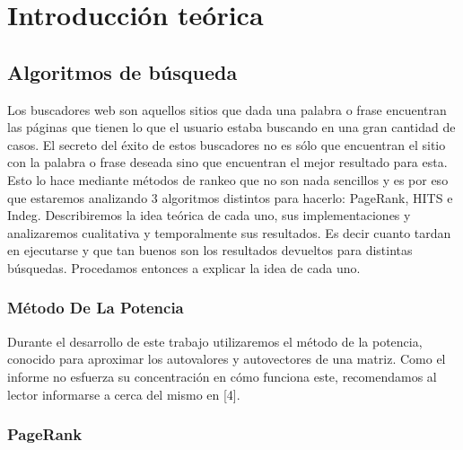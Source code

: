 \section{Introducci\'on te\'orica}

\subsection{Algoritmos de búsqueda}

Los buscadores web son aquellos sitios que dada una palabra o frase encuentran las páginas que tienen lo que el usuario estaba buscando en una gran cantidad de casos. El secreto del éxito de estos buscadores no es sólo que encuentran el sitio con la palabra o frase deseada sino que encuentran el mejor resultado para esta. \\
Esto lo hace mediante métodos de rankeo que no son nada sencillos y es por eso que estaremos analizando 3 algoritmos distintos para hacerlo: PageRank, HITS e Indeg. Describiremos la idea teórica de cada uno, sus implementaciones y analizaremos cualitativa y temporalmente sus resultados. Es decir cuanto tardan en ejecutarse y que tan buenos son los resultados devueltos para distintas búsquedas. Procedamos entonces a explicar la idea de cada uno.

\subsubsection{Método De La Potencia}
Durante el desarrollo de este trabajo utilizaremos el método de la potencia, conocido para aproximar los autovalores y autovectores de una matriz. Como el informe no esfuerza su concentración en cómo funciona este, recomendamos al lector informarse a cerca del mismo en [4].

\subsubsection{PageRank}

